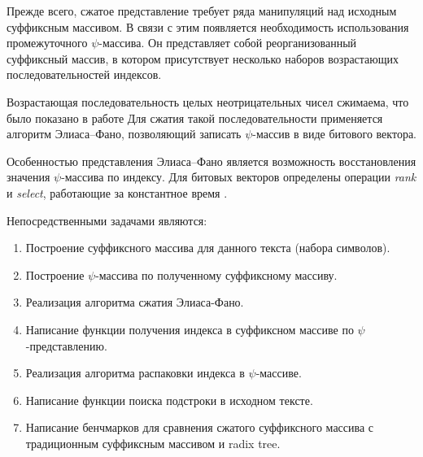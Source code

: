 
Прежде всего, сжатое представление требует ряда манипуляций над исходным суффиксным массивом.
В связи с этим появляется необходимость использования промежуточного $\psi$-массива.
Он представляет собой реорганизованный суффиксный массив,
в котором присутствует несколько наборов возрастающих последовательностей индексов.

Возрастающая последовательность целых неотрицательных чисел сжимаема, что было показано в работе \cite{pibiri2014dynamic}
Для сжатия такой последовательности применяется алгоритм Элиаса--Фано, позволяющий записать
$\psi$-массив в виде битового вектора.

Особенностью представления Элиаса--Фано является возможность восстановления значения $\psi$-массива
по индексу. Для битовых векторов определены операции \emph{rank} и \emph{select},
работающие за константное время \cite{farina2009rank}.

Непосредственными задачами являются:

\begin{enumerate}
    \item Построение суффиксного массива для данного текста (набора символов).
    \item Построение $\psi$-массива по полученному суффиксному массиву.
    \item Реализация алгоритма сжатия Элиаса-Фано.
    \item Написание функции получения индекса в суффиксном массиве по $\psi$-представлению.
    \item Реализация алгоритма распаковки индекса в $\psi$-массиве.
    \item Написание функции поиска подстроки в исходном тексте.
    \item Написание бенчмарков для сравнения сжатого суффиксного массива
    с традиционным суффиксным массивом и radix tree.
\end{enumerate}



